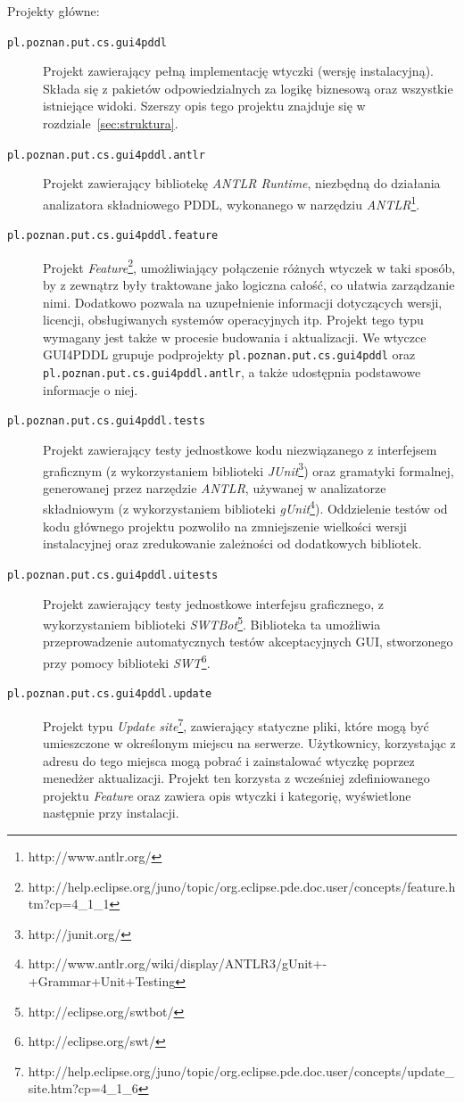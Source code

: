 Projekty główne:
\begin{description}
\item [\texttt{pl.poznan.put.cs.gui4pddl}] Projekt zawierający pełną implementację wtyczki (wersję instalacyjną). Składa się z pakietów odpowiedzialnych za logikę biznesową oraz wszystkie istniejące widoki. Szerszy opis tego projektu znajduje się w rozdziale~\ref{sec:struktura}.
\item [\texttt{pl.poznan.put.cs.gui4pddl.antlr}] Projekt zawierający bibliotekę \emph{ANTLR Runtime}, niezbędną do działania analizatora składniowego PDDL, wykonanego w narzędziu \emph{ANTLR}\footnote{http://www.antlr.org/}.
\item [\texttt{pl.poznan.put.cs.gui4pddl.feature}] Projekt \emph{Feature}\footnote{http://help.eclipse.org/juno/topic/org.eclipse.pde.doc.user/concepts/feature.htm?cp=4\_1\_1}, umożliwiający połączenie różnych wtyczek w taki sposób, by z zewnątrz były traktowane jako logiczna całość, co ułatwia zarządzanie nimi. Dodatkowo pozwala na uzupełnienie informacji dotyczących wersji, licencji, obsługiwanych systemów operacyjnych itp. Projekt tego typu wymagany jest także w procesie budowania i aktualizacji. We wtyczce GUI4PDDL grupuje podprojekty \texttt{pl.poznan.put.cs.gui4pddl} oraz \texttt{pl.poznan.put.cs.gui4pddl.antlr}, a także udostępnia podstawowe informacje o niej.
\item [\texttt{pl.poznan.put.cs.gui4pddl.tests}] Projekt zawierający testy jednostkowe kodu niezwiązanego z interfejsem graficznym (z wykorzystaniem biblioteki \emph{JUnit}\footnote{http://junit.org/}) oraz gramatyki formalnej, generowanej przez narzędzie \emph{ANTLR}, używanej w analizatorze składniowym (z wykorzystaniem biblioteki \emph{gUnit}\footnote{http://www.antlr.org/wiki/display/ANTLR3/gUnit+-+Grammar+Unit+Testing}). Oddzielenie testów od kodu głównego projektu pozwoliło na zmniejszenie wielkości wersji instalacyjnej oraz zredukowanie zależności od dodatkowych bibliotek.
\item [\texttt{pl.poznan.put.cs.gui4pddl.uitests}] Projekt zawierający testy jednostkowe interfejsu graficznego, z wykorzystaniem biblioteki \emph{SWTBot}\footnote{http://eclipse.org/swtbot/}. Biblioteka ta umożliwia przeprowadzenie automatycznych testów akceptacyjnych GUI, stworzonego przy pomocy biblioteki \emph{SWT}\footnote{http://eclipse.org/swt/}.
\item [\texttt{pl.poznan.put.cs.gui4pddl.update}] Projekt typu \emph{Update site}\footnote{http://help.eclipse.org/juno/topic/org.eclipse.pde.doc.user/concepts/update\_site.htm?cp=4\_1\_6}, zawierający statyczne pliki, które mogą być umieszczone w określonym miejscu na serwerze. Użytkownicy, korzystając z adresu do tego miejsca mogą pobrać i zainstalować wtyczkę poprzez menedżer aktualizacji. Projekt ten korzysta z wcześniej zdefiniowanego projektu \emph{Feature} oraz zawiera opis wtyczki i kategorię, wyświetlone następnie przy instalacji.
\end{description}

